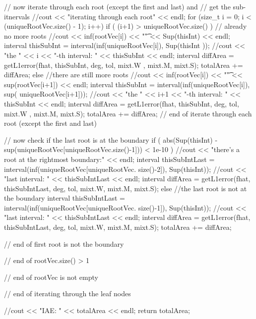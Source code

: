 \begin{DoxyCode}
{{{{{          // now iterate through each root (except the first and last) and 
          // get the sub-itnervals
          //cout << "iterating through each root" << endl;
          for (size_t i = 0; i < (uniqueRootVec.size() - 1); i++) {
            if ( (i+1) > uniqueRootVec.size() ) { // already no more roots
              //cout << inf(rootVec[i]) << "\t" << Sup(thisInt) << endl;
              interval thisSubInt = interval(inf(uniqueRootVec[i]), Sup(thisInt
      ));
              //cout << "the " << i << "-th interval: " << thisSubInt << endl;
              interval diffArea = getL1error(fhat, thisSubInt,  deg, tol, mixt.W
      , mixt.M, mixt.S);
              totalArea += diffArea;
            }
            else { //there are still more roots
              //cout << inf(rootVec[i]) << "\t" << sup(rootVec[i+1]) << endl;
              interval thisSubInt = interval(inf(uniqueRootVec[i]), sup(
      uniqueRootVec[i+1]));
              //cout << "the " << i+1 << "-th interval: " << thisSubInt <<
       endl;
              interval diffArea = getL1error(fhat, thisSubInt,  deg, tol, mixt.W
      , mixt.M, mixt.S);
              totalArea += diffArea;
            }
          } // end of iterate through each root (except the first and last)
          
          // now check if the last root is at the boundary
          if ( abs(Sup(thisInt) - sup(uniqueRootVec[uniqueRootVec.size()-1])) <
       1e-10 ) {
            //cout << "there's a root at the rightmost boundary:" << endl;
            interval thisSubIntLast = interval(inf(uniqueRootVec[uniqueRootVec.
      size()-2]), Sup(thisInt));
            //cout << "last interval: " << thisSubIntLast << endl; 
            interval diffArea = getL1error(fhat, thisSubIntLast,  deg, tol, 
      mixt.W, mixt.M, mixt.S);
          }
          else { //the last root is not at the boundary
            interval thisSubIntLast = interval(inf(uniqueRootVec[uniqueRootVec.
      size()-1]), Sup(thisInt));
            //cout << "last interval: " << thisSubIntLast << endl; 
            interval diffArea = getL1error(fhat, thisSubIntLast,  deg, tol, 
      mixt.W, mixt.M, mixt.S);
            totalArea += diffArea;
          } 
        } // end of first root is not the boundary
      } // end of rootVec.size() > 1
    } // end of rootVec is not empty

  } // end of iterating through the leaf nodes
  
  //cout << "IAE: " << totalArea << endl;
  return totalArea;
}
\end{DoxyCode}
